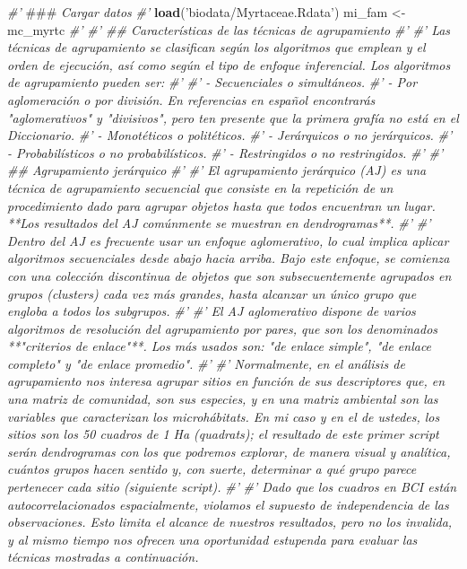 \documentclass[11pt,]{article}
\newenvironment{Shaded}{\begin{snugshade}}{\end{snugshade}}
\newcommand{\KeywordTok}[1]{\textcolor[rgb]{0.13,0.29,0.53}{\textbf{#1}}}
\newcommand{\StringTok}[1]{\textcolor[rgb]{0.31,0.60,0.02}{#1}}
\newcommand{\CommentTok}[1]{\textcolor[rgb]{0.56,0.35,0.01}{\textit{#1}}}
\newcommand{\AlertTok}[1]{\textcolor[rgb]{0.94,0.16,0.16}{#1}}
\newcommand{\NormalTok}[1]{#1}
\begin{document}
\begin{Shaded}
\begin{Highlighting}[]
\CommentTok{#' }\AlertTok{###}\CommentTok{ Cargar datos}
\CommentTok{#' }
\KeywordTok{load}\NormalTok{(}\StringTok{'biodata/Myrtaceae.Rdata'}\NormalTok{)}
\NormalTok{mi_fam <-}\StringTok{ }\NormalTok{mc_myrtc}
\CommentTok{#'}
\CommentTok{#' ## Características de las técnicas de agrupamiento}
 \CommentTok{#' }
\CommentTok{#' Las técnicas de agrupamiento se clasifican según los algoritmos que emplean y el orden de ejecución, así como según el tipo de enfoque inferencial. Los algoritmos de agrupamiento pueden ser:}
\CommentTok{#' }
\CommentTok{#' - Secuenciales o simultáneos.}
\CommentTok{#' - Por aglomeración o por división. En referencias en español encontrarás "aglomerativos" y "divisivos", pero ten presente que la primera grafía no está en el Diccionario.}
\CommentTok{#' - Monotéticos o politéticos.}
\CommentTok{#' - Jerárquicos o no jerárquicos.}
\CommentTok{#' - Probabilísticos o no probabilísticos.}
\CommentTok{#' - Restringidos o no restringidos.}
\CommentTok{#' }
\CommentTok{#' ## Agrupamiento jerárquico}
\CommentTok{#' }
\CommentTok{#' El agrupamiento jerárquico (AJ) es una técnica de agrupamiento secuencial que consiste en la repetición de un procedimiento dado para agrupar objetos hasta que todos encuentran un lugar. **Los resultados del AJ comúnmente se muestran en dendrogramas**.}
\CommentTok{#' }
\CommentTok{#' Dentro del AJ es frecuente usar un enfoque aglomerativo, lo cual implica aplicar algoritmos secuenciales desde abajo hacia arriba. Bajo este enfoque, se comienza con una colección discontinua de objetos que son subsecuentemente agrupados en grupos (clusters) cada vez más grandes, hasta alcanzar un único grupo que engloba a todos los subgrupos.}
\CommentTok{#' }
\CommentTok{#' El AJ aglomerativo dispone de varios algoritmos de resolución del agrupamiento por pares, que son los denominados **"criterios de enlace"**. Los más usados son: "de enlace simple", "de enlace completo" y "de enlace promedio".}
\CommentTok{#' }
\CommentTok{#' Normalmente, en el análisis de agrupamiento nos interesa agrupar sitios en función de sus descriptores que, en una matriz de comunidad, son sus especies, y en una matriz ambiental son las variables que caracterizan los microhábitats. En mi caso y en el de ustedes, los sitios son los 50 cuadros de 1 Ha (quadrats); el resultado de este primer script serán dendrogramas con los que podremos explorar, de manera visual y analítica, cuántos grupos hacen sentido y, con suerte, determinar a qué grupo parece pertenecer cada sitio (siguiente script).}
\CommentTok{#' }
\CommentTok{#' Dado que los cuadros en BCI están autocorrelacionados espacialmente, violamos el supuesto de independencia de las observaciones. Esto limita el alcance de nuestros resultados, pero no los invalida, y al mismo tiempo nos ofrecen una oportunidad estupenda para evaluar las técnicas mostradas a continuación.}

\end{Highlighting}
\end{Shaded}
\end{document}
